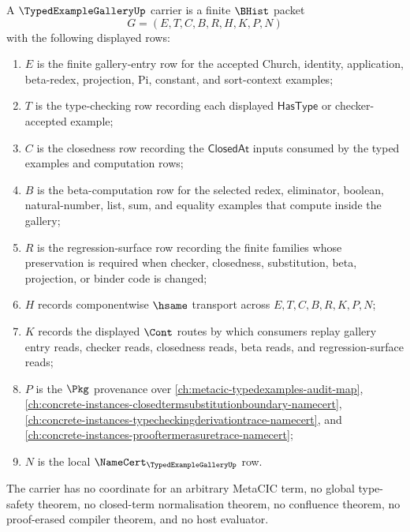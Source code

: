 \begin{definition}
\label{def:typed-example-gallery-carrier}
A $\TypedExampleGalleryUp$ carrier is a finite $\BHist$ packet
$$
G=(E,T,C,B,R,H,K,P,N)
$$
with the following displayed rows:
\begin{enumerate}
\item $E$ is the finite gallery-entry row for the accepted Church, identity, application, beta-redex, projection, Pi, constant, and sort-context examples;
\item $T$ is the type-checking row recording each displayed $\mathsf{HasType}$ or checker-accepted example;
\item $C$ is the closedness row recording the $\mathsf{ClosedAt}$ inputs consumed by the typed examples and computation rows;
\item $B$ is the beta-computation row for the selected redex, eliminator, boolean, natural-number, list, sum, and equality examples that compute inside the gallery;
\item $R$ is the regression-surface row recording the finite families whose preservation is required when checker, closedness, substitution, beta, projection, or binder code is changed;
\item $H$ records componentwise $\hsame$ transport across $E,T,C,B,R,K,P,N$;
\item $K$ records the displayed $\Cont$ routes by which consumers replay gallery entry reads, checker reads, closedness reads, beta reads, and regression-surface reads;
\item $P$ is the $\Pkg$ provenance over \autoref{ch:metacic-typedexamples-audit-map}, \autoref{ch:concrete-instances-closedtermsubstitutionboundary-namecert}, \autoref{ch:concrete-instances-typecheckingderivationtrace-namecert}, and \autoref{ch:concrete-instances-prooftermerasuretrace-namecert};
\item $N$ is the local $\NameCert_{\TypedExampleGalleryUp}$ row.
\end{enumerate}
The carrier has no coordinate for an arbitrary MetaCIC term, no global type-safety theorem, no closed-term normalisation theorem, no confluence theorem, no proof-erased compiler theorem, and no host evaluator.
\end{definition}

